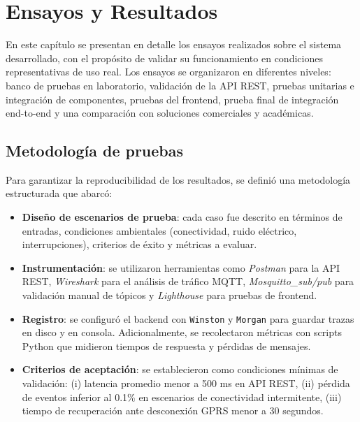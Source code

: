
\chapter{Ensayos y Resultados} %

\label{sec:ensayos-resultados}

En este capítulo se presentan en detalle los ensayos realizados sobre el sistema desarrollado, 
con el propósito de validar su funcionamiento en condiciones representativas de uso real. 
Los ensayos se organizaron en diferentes niveles: banco de pruebas en laboratorio, 
validación de la API REST, pruebas unitarias e integración de componentes, 
pruebas del frontend, prueba final de integración end-to-end y una comparación 
con soluciones comerciales y académicas.  

\section{Metodología de pruebas}
\label{sec:metodologia-pruebas}

Para garantizar la reproducibilidad de los resultados, se definió una metodología estructurada que abarcó:

\begin{itemize}
    \item \textbf{Diseño de escenarios de prueba}: cada caso fue descrito en términos de entradas, condiciones ambientales (conectividad, ruido eléctrico, interrupciones), criterios de éxito y métricas a evaluar.
    \item \textbf{Instrumentación}: se utilizaron herramientas como \textit{Postman} para la API REST, \textit{Wireshark} para el análisis de tráfico MQTT, \textit{Mosquitto\_sub/pub} para validación manual de tópicos y \textit{Lighthouse} para pruebas de frontend.
    \item \textbf{Registro}: se configuró el backend con \texttt{Winston} y \texttt{Morgan} para guardar trazas en disco y en consola. Adicionalmente, se recolectaron métricas con scripts Python que midieron tiempos de respuesta y pérdidas de mensajes.
    \item \textbf{Criterios de aceptación}: se establecieron como condiciones mínimas de validación: 
    (i) latencia promedio menor a 500 ms en API REST, 
    (ii) pérdida de eventos inferior al 0.1\% en escenarios de conectividad intermitente,
    (iii) tiempo de recuperación ante desconexión GPRS menor a 30 segundos.
\end{itemize}

